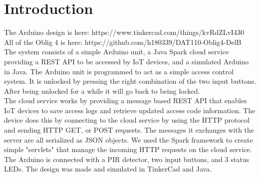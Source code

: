 \section{Introduction}
\label{sec:introduction}
The Arduino design is here:  https://www.tinkercad.com/things/kvRdZLvI430 \\
All of the Oblig 4 is here: https://github.com/h180339/DAT110-Oblig4-DelB\\

The system consists of a simple Arduino unit, a Java Spark cloud service providing a REST API to be accessed by IoT devices, and a simulated Arduino in Java. The Arduino unit is programmed to act as a simple access control system. It is unlocked by pressing the right combination of the two input buttons. After being unlocked for a while it will go back to being locked.\\

The cloud service works by providing a message based REST API that enables IoT devices to save access logs and retrieve updated access code information. The device does this by connecting to the cloud service by using the HTTP protocol and sending HTTP GET, or POST requests. The messages it exchanges with the server are all serialized as JSON objects. We used the Spark framework to create simple "servlets" that manage the incoming HTTP requests on the cloud service.\\

The Arduino is connected with a PIR detector, two input buttons, and 3 status LEDs. The design was made and simulated in TinkerCad and Java.

\pagebreak